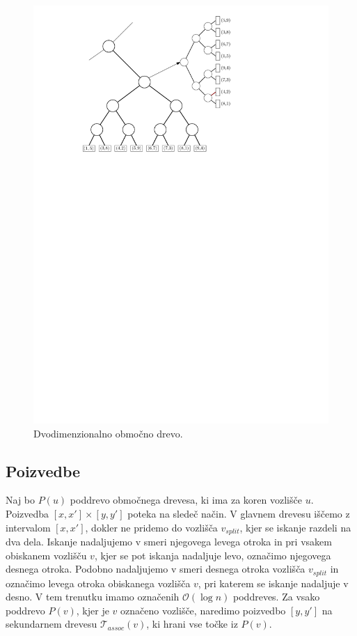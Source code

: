 \documentclass[a4paper, 12pt]{book}
\newcommand{\T}{\ensuremath{\mathcal{T}}}
\newcommand{\OO}{\ensuremath{\mathcal{O}}} %
\begin{document}
\begin{figure}[htp]
\centerline{\includegraphics[scale=1]{pics/rangeTree2.pdf}}
\caption{Dvodimenzionalno območno drevo.}
\label{range-primer}
\end{figure}

\subsection{Poizvedbe}
Naj bo $P(u)$ poddrevo območnega drevesa, ki ima za koren vozlišče $u$. Poizvedba $[x,x'] \times [y,y']$ poteka na sledeč način. V glavnem drevesu iščemo z intervalom $[x,x']$, dokler ne pridemo do vozlišča $v_{split}$, kjer se iskanje razdeli na dva dela. Iskanje nadaljujemo v smeri njegovega levega otroka in pri vsakem obiskanem vozlišču $v$, kjer se pot iskanja nadaljuje levo, označimo njegovega desnega otroka. Podobno nadaljujemo v smeri desnega otroka vozlišča $v_{split}$ in označimo levega otroka obiskanega vozlišča $v$, pri katerem se iskanje nadaljuje v desno. 
V tem trenutku imamo označenih $\OO(\log n)$ poddreves. Za vsako poddrevo $P(v)$, kjer je $v$ označeno vozlišče, naredimo poizvedbo $[y,y']$ na sekundarnem drevesu $\T_{assoc}(v)$, ki hrani vse točke iz $P(v)$. 
\end{document}
